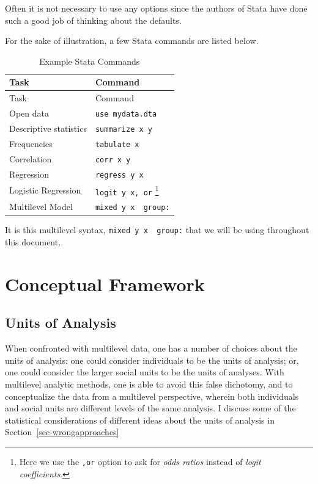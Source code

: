 \documentclass[
  letterpaper,
  DIV=11,
  numbers=noendperiod]{scrreprt}
\begin{document}
Often it is not necessary to use any options since the authors of Stata
have done such a good job of thinking about the defaults.

For the sake of illustration, a few Stata commands are listed below.

\hypertarget{tbl-Statacommands}{}
\begin{longtable}[]{@{}ll@{}}
\caption{\label{tbl-Statacommands}Example Stata Commands}\tabularnewline
\toprule()
Task & Command \\
\midrule()
\endfirsthead
\toprule()
Task & Command \\
\midrule()
\endhead
Open data & \texttt{use\ mydata.dta} \\
Descriptive statistics & \texttt{summarize\ x\ y} \\
Frequencies & \texttt{tabulate\ x} \\
Correlation & \texttt{corr\ x\ y} \\
Regression & \texttt{regress\ y\ x} \\
Logistic Regression & \texttt{logit\ y\ x,\ or} \footnote{Here we use
  the \texttt{,or} option to ask for \emph{odds ratios} instead of
  \emph{logit coefficients}.} \\
Multilevel Model & \texttt{mixed\ y\ x\ \textbar{}\textbar{}\ group:} \\
\bottomrule()
\end{longtable}

It is this multilevel syntax,
\texttt{mixed\ y\ x\ \textbar{}\textbar{}\ group:} that we will be using
throughout this document.


\hypertarget{conceptual-framework}{%
\chapter{Conceptual Framework}\label{conceptual-framework}}

\hypertarget{units-of-analysis}{%
\section{Units of Analysis}\label{units-of-analysis}}

When confronted with multilevel data, one has a number of choices about
the units of analysis: one could consider individuals to be the units of
analysis; or, one could consider the larger social units to be the units
of analyses. With multilevel analytic methods, one is able to avoid this
false dichotomy, and to conceptualize the data from a multilevel
perspective, wherein both individuals and social units are different
levels of the same analysis. I discuss some of the statistical
considerations of different ideas about the units of analysis in
Section~\ref{sec-wrongapproaches}
\end{document}
